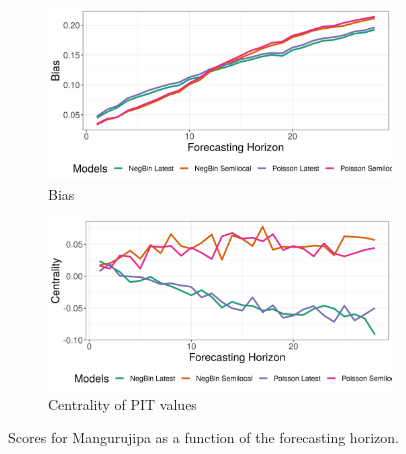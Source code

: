 \begin{figure}[H]
\begin{subfigure}{0.5\textwidth}
  \centering
  \includegraphics[width=\linewidth]{../output/Mangurujipa_bias.png}  
  \caption{Bias}
  \label{fig:Mangurujipa_scores_3}
\end{subfigure}
\begin{subfigure}{0.5\textwidth}
  \centering
  \includegraphics[width=\linewidth]{../output/Mangurujipa_centrality.png}  
  \caption{Centrality of PIT values}
  \label{fig:Mangurujipa_scores_4}
\end{subfigure}
  \caption{Scores for Mangurujipa as a function of the forecasting horizon.}

  \label{fig:nat_scores}
\end{figure}
